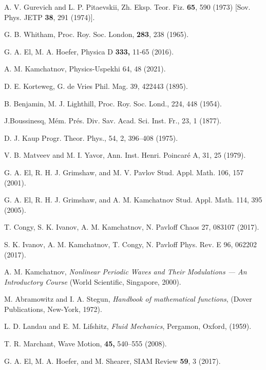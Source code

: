 \documentclass[pre,aps,superscriptaddress,twocolumn,floatfix]{revtex4-1}
\begin{document}
	
	\begin{thebibliography}{0}
		
		A. V. Gurevich and L. P. Pitaevskii,
		Zh. Eksp. Teor. Fiz. {\bf 65}, 590 (1973) [Sov. Phys. JETP {\bf 38},
		291 (1974)].

		G. B. Whitham,
		Proc. Roy. Soc. London, {\bf 283}, 238 (1965).
	
		G. A. El, M. A. Hoefer, Physica D {\bf 333,}  11-65 (2016).

		A. M. Kamchatnov, Physics-Uspekhi 64, 48 (2021).
 		
		D. E. Korteweg, G. de Vries
		Phil. Mag. 39, 422443 (1895).
		
		B. Benjamin, M. J. Lighthill,
		Proc. Roy. Soc. Lond., 224, 448 (1954).
		
		J.Boussinesq,
		M\'{e}m. Pr\'{e}s. Div. Sav. Acad. Sci. Inst. Fr., 23, 1 (1877).
		
		D. J. Kaup
		Progr. Theor. Phys., 54, 2, 396--408 (1975).

		V. B. Matveev and M. I. Yavor,
		Ann. Inst. Henri. Poincar\'{e} A, 31, 25 (1979).

		G. A. El, R. H. J. Grimshaw, and M. V. Pavlov
		Stud. Appl. Math. 106, 157 (2001).

		G. A. El, R. H. J. Grimshaw, and A. M. Kamchatnov
		Stud. Appl. Math. 114, 395 (2005).

		T. Congy, S. K. Ivanov, A. M. Kamchatnov, N. Pavloff
		Chaos 27, 083107 (2017).

		S. K. Ivanov, A. M. Kamchatnov, T. Congy, N. Pavloff
		Phys. Rev. E 96, 062202 (2017).

		
		A. M. Kamchatnov, {\it Nonlinear Periodic Waves and
			Their Modulations --- An Introductory Course} (World Scientific,
		Singapore, 2000).
		

		M. Abramowitz and I. A. Stegun, {\it Handbook of
			mathematical functions}, (Dover Publications, New-York, 1972).
		
		
		
		
		
		L. D. Landau and E. M. Lifshitz, {\it Fluid Mechanics},
		Pergamon, Oxford, (1959).
		
		T. R. Marchant, Wave Motion, {\bf 45,} 540--555 (2008).
		
		
		G. A. El, M. A. Hoefer, and M. Shearer, SIAM Review {\bf 59},
		3 (2017).
		
		
		
		
		
		
	\end{thebibliography}
\end{document}
